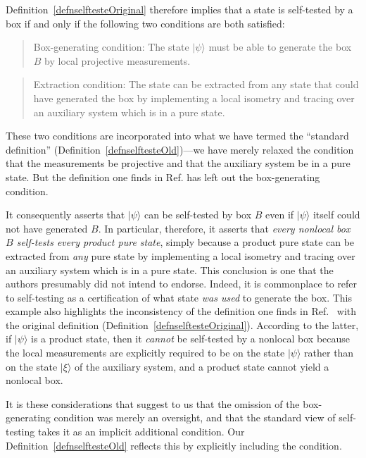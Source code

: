 \documentclass[12pt]{article}
\newcommand{\rob}{\color{black}}
\newcommand{\blk}{\color{black}}
\theoremstyle{plain}
\theoremstyle{definition}
\begin{document}
\begin{appendices}
 
  Definition~\ref{defnselftesteOriginal} therefore
  implies that a state is self-tested by a box if and only if the following two conditions are both satisfied:
\begin{quote} Box-generating condition: The state $|\psi\rangle$ must be able to generate the box $B$ by local projective measurements.
\end{quote}
\begin{quote} Extraction condition: The state can be extracted from any state that could have generated the box by implementing a local isometry and tracing over an auxiliary system which is in a pure state.
\end{quote}
These two conditions are incorporated into what we have termed the ``standard definition'' (Definition~\ref{defnselftesteOld})---we have merely relaxed the condition that the measurements be projective and that the auxiliary system be in a pure state.  But the definition one finds in Ref.\cite{vsupic2020self}
 has left out the box-generating condition.

 It consequently 
asserts that  $|\psi\rangle$ can be self-tested by box $B$ even if $|\psi\rangle$ itself could not have generated $B$.  In particular, therefore, it asserts that {\em every nonlocal box $B$ self-tests every 
product pure state}, simply because a product
 pure state can be extracted from {\em any} pure state by 
\rob implementing a local isometry and tracing over an auxiliary system which is in a pure state\blk.
 This conclusion is one that the authors presumably did not intend to endorse.  Indeed, it is commonplace to refer to self-testing as a certification of what state {\em was used} to generate the box.  This example also highlights the inconsistency of the definition one finds in Ref.~\cite{vsupic2020self} with the original definition (Definition~\ref{defnselftesteOriginal}).  According to the latter, if $|\psi\rangle$ is a product state, then it {\em cannot}  be self-tested by a nonlocal box because  the local measurements are explicitly required to be on the state $|\psi\rangle$ rather than on the state $|\xi\rangle$ of the auxiliary system, and a product state cannot yield a nonlocal box. 

It is these considerations that suggest to us that the omission of the box-generating condition was merely an oversight, and that the standard view of self-testing takes it as an implicit additional condition. Our Definition~\ref{defnselftesteOld} reflects this by explicitly including the condition.


\end{appendices}
\end{document}
